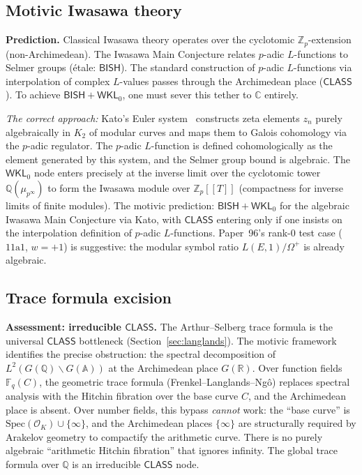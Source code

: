 \documentclass[11pt,a4paper]{article}
\theoremstyle{plain}
\theoremstyle{definition}
\newcommand{\BISH}{\textsf{BISH}}
\newcommand{\WKL}{\textsf{WKL}_0}
\newcommand{\CLASS}{\textsf{CLASS}}
\newcommand{\Z}{\mathbb{Z}}
\newcommand{\Q}{\mathbb{Q}}
\newcommand{\R}{\mathbb{R}}
\newcommand{\C}{\mathbb{C}}
\newcommand{\F}{\mathbb{F}}
\newcommand{\A}{\mathbb{A}}
\newcommand{\Spec}{\mathrm{Spec}}
\begin{document}
\subsection{Motivic Iwasawa theory}

\textbf{Prediction.} Classical Iwasawa theory operates over the cyclotomic $\Z_p$-extension (non-Archimedean). The Iwasawa Main Conjecture relates $p$-adic $L$-functions to Selmer groups (\'etale: $\BISH$). The standard construction of $p$-adic $L$-functions via interpolation of complex $L$-values passes through the Archimedean place ($\CLASS$). To achieve $\BISH + \WKL$, one must sever this tether to $\C$ entirely.

\emph{The correct approach:} Kato's Euler system~\cite{kato04} constructs zeta elements $z_n$ purely algebraically in $K_2$ of modular curves and maps them to Galois cohomology via the $p$-adic regulator. The $p$-adic $L$-function is defined cohomologically as the element generated by this system, and the Selmer group bound is algebraic. The $\WKL$ node enters precisely at the inverse limit over the cyclotomic tower $\Q(\mu_{p^\infty})$ to form the Iwasawa module over $\Z_p[\![T]\!]$ (compactness for inverse limits of finite modules). The motivic prediction: $\BISH + \WKL$ for the algebraic Iwasawa Main Conjecture via Kato, with $\CLASS$ entering only if one insists on the interpolation definition of $p$-adic $L$-functions. Paper~96's rank-0 test case ($11\mathrm{a}1$, $w = +1$) is suggestive: the modular symbol ratio $L(E,1)/\Omega^+$ is already algebraic.

\subsection{Trace formula excision}

\textbf{Assessment: irreducible $\CLASS$.} The Arthur--Selberg trace formula is the universal $\CLASS$ bottleneck (Section~\ref{sec:langlands}). The motivic framework identifies the precise obstruction: the spectral decomposition of $L^2(G(\Q) \backslash G(\A))$ at the Archimedean place $G(\R)$. Over function fields $\F_q(C)$, the geometric trace formula (Frenkel--Langlands--Ng\^o) replaces spectral analysis with the Hitchin fibration over the base curve $C$, and the Archimedean place is absent. Over number fields, this bypass \emph{cannot} work: the ``base curve'' is $\Spec(\mathcal{O}_K) \cup \{\infty\}$, and the Archimedean places $\{\infty\}$ are structurally required by Arakelov geometry to compactify the arithmetic curve. There is no purely algebraic ``arithmetic Hitchin fibration'' that ignores infinity. The global trace formula over $\Q$ is an irreducible $\CLASS$ node.
\end{document}
